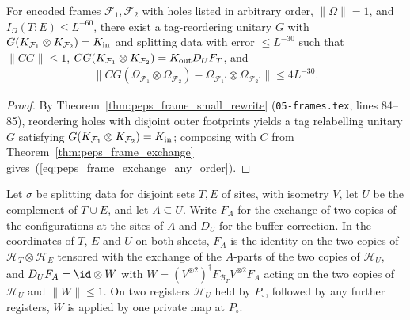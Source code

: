 \begin{lemma}
    \label{thm:peps_frame_exchange_any_order}
    \leanok
    For encoded frames $\mathcal F_1,\mathcal F_2$ with holes listed in
    arbitrary order, $\lVert\Omega\rVert=1$, and $I_\Omega(T:E)\le L^{-60}$,
    there exist a tag-reordering unitary $G$ with
    $G(K_{\mathcal F_1}\otimes K_{\mathcal F_2})=K_{\rm in}$ and splitting data
    with error $\le L^{-30}$ such that $\|CG\|\le 1$,
    $CG(K_{\mathcal F_1}\otimes K_{\mathcal F_2})=K_{\rm out}D_UF_T$, and
    \begin{align}
        \lVert CG(\Omega_{\mathcal F_1}\otimes\Omega_{\mathcal F_2})
        -\Omega_{\mathcal F_1'}\otimes\Omega_{\mathcal F_2'}\rVert
        \le4L^{-30}.
        \label{eq:peps_frame_exchange_any_order}
    \end{align}
\end{lemma}

\begin{proof}\leanok
    By Theorem~\ref{thm:peps_frame_small_rewrite} (\texttt{05-frames.tex},
    lines 84--85), reordering holes with disjoint outer footprints yields a tag
    relabelling unitary $G$ satisfying
    $G(K_{\mathcal F_1}\otimes K_{\mathcal F_2})=K_{\rm in}$; composing with
    $C$ from Theorem~\ref{thm:peps_frame_exchange} gives~(\ref{eq:peps_frame_exchange_any_order}).
\end{proof}

\begin{lemma}
    \label{lem:lattice_exchange_correction_matrix}
    \leanok
    Let $\sigma$ be splitting data for disjoint sets $T,E$ of sites, with isometry
    $V$, let $U$ be the complement of $T\cup E$, and let $A\subseteq U$. Write $F_A$
    for the exchange of two copies of the configurations at the sites of $A$ and
    $D_U$ for the buffer correction. In the coordinates of $T$, $E$ and $U$ on both
    sheets, $F_A$ is the identity on the two copies of
    $\mathcal H_T\otimes\mathcal H_E$ tensored with the exchange of the $A$-parts of
    the two copies of $\mathcal H_U$, and $D_UF_A=\id\otimes W$ with
    $W=(V^{\otimes2})^\dagger F_{\mathcal B_T}V^{\otimes2}F_A$ acting on the two
    copies of $\mathcal H_U$ and $\lVert W\rVert\le1$. On two registers
    $\mathcal H_U$ held by $P_\circ$, followed by any further registers, $W$ is
    applied by one private map at $P_\circ$.
\end{lemma}

